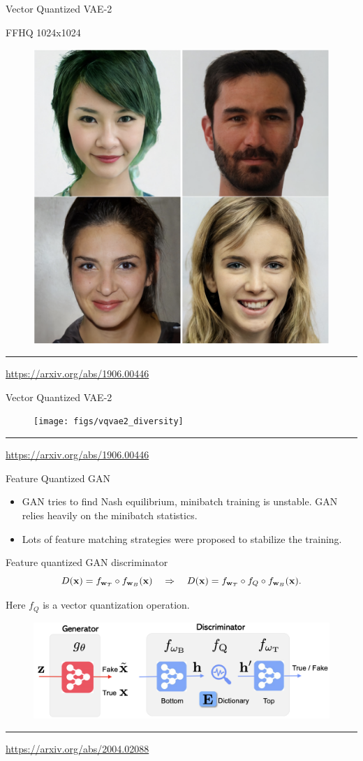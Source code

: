 \begin{frame}{Vector Quantized VAE-2}
	\begin{block}{FFHQ 1024x1024}
	\begin{figure}
		\centering
		\includegraphics[width=0.63\linewidth]{figs/vqvae2_faces}
	\end{figure}
	\end{block}
	\vfill
	\hrule\medskip
	{\scriptsize \href{https://arxiv.org/abs/1906.00446}{https://arxiv.org/abs/1906.00446}} 
\end{frame}
\begin{frame}{Vector Quantized VAE-2}
	\begin{figure}
		\centering
		\texttt{[image: figs/vqvae2\_diversity]}
	\end{figure}
	\vfill
	\hrule\medskip
	{\scriptsize \href{https://arxiv.org/abs/1906.00446}{https://arxiv.org/abs/1906.00446}} 
\end{frame}
\begin{frame}{Feature Quantized GAN}
	\begin{itemize}
		\item GAN tries to find Nash equilibrium, minibatch training is unstable. GAN relies heavily on the minibatch statistics.
		\item Lots of feature matching strategies were proposed to stabilize the training. 
	\end{itemize}
	\begin{block}{Feature quantized GAN discriminator}
		\[
			D(\mathbf{x}) = f_{\mathbf{w}_T} \circ f_{\mathbf{w}_B}(\mathbf{x}) \quad \Rightarrow \quad D(\mathbf{x}) = f_{\mathbf{w}_T} \circ f_Q \circ f_{\mathbf{w}_B}(\mathbf{x}). 
		\]
	\end{block}
	Here $f_Q$ is a vector quantization operation.
	\begin{figure}
		\centering
		\includegraphics[width=0.7\linewidth]{figs/fqgan}
	\end{figure}
	\vfill
	\hrule\medskip
	{\scriptsize \href{https://arxiv.org/abs/2004.02088}{https://arxiv.org/abs/2004.02088}} 
\end{frame}
